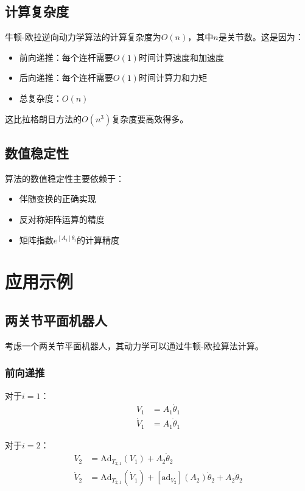 \documentclass[12pt,a4paper]{article}
\begin{document}
    \subsection{计算复杂度}
    
    牛顿-欧拉逆向动力学算法的计算复杂度为$O(n)$，其中$n$是关节数。这是因为：
    \begin{itemize}
    \item 前向递推：每个连杆需要$O(1)$时间计算速度和加速度
    \item 后向递推：每个连杆需要$O(1)$时间计算力和力矩
    \item 总复杂度：$O(n)$
    \end{itemize}
    
    这比拉格朗日方法的$O(n^3)$复杂度要高效得多。
    
    \subsection{数值稳定性}
    
    算法的数值稳定性主要依赖于：
    \begin{itemize}
    \item 伴随变换的正确实现
    \item 反对称矩阵运算的精度
    \item 矩阵指数$e^{[A_i]\theta_i}$的计算精度
    \end{itemize}
    
    \section{应用示例}
    
    \subsection{两关节平面机器人}
    
    考虑一个两关节平面机器人，其动力学可以通过牛顿-欧拉算法计算。
    
    \subsubsection{前向递推}
    
    对于$i = 1$：
    \begin{align}
    V_1 &= A_1 \dot{\theta}_1 \\
    \dot{V}_1 &= A_1 \ddot{\theta}_1
    \end{align}
    
    对于$i = 2$：
    \begin{align}
    V_2 &= \text{Ad}_{T_{2,1}}(V_1) + A_2 \dot{\theta}_2 \\
    \dot{V}_2 &= \text{Ad}_{T_{2,1}}(\dot{V}_1) + [\text{ad}_{V_2}](A_2) \dot{\theta}_2 + A_2 \ddot{\theta}_2
    \end{align}
    
\end{document}
